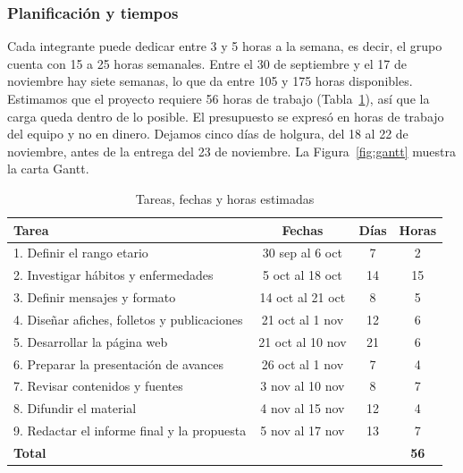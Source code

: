 \documentclass[12pt, letterpaper, table, xcdraw]{extarticle}
\newcommand{\leyendaFont}[1]{\fontsize{10}{12}\selectfont #1}
\newcommand{\filaTabla}[1]{#1\\\hline}
\newcommand{\tabla}[4]{%
    \begin{table}[!htbp]
        \centering
        \caption{\leyendaFont{#1}}
        \label{tab:#2}
        {\scriptsize
            \begin{tabular}{#3}
                \hline #4
            \end{tabular}
        }
    \end{table}
}
\begin{document}
\subsubsection{Planificación y tiempos}

Cada integrante puede dedicar entre 3 y 5 horas a la semana, es decir, el grupo cuenta con 15 a 25 horas semanales. Entre el 30 de septiembre y el 17 de noviembre hay siete semanas, lo que da entre 105 y 175 horas disponibles. Estimamos que el proyecto requiere 56 horas de trabajo (Tabla~\ref{tab:horas}), así que la carga queda dentro de lo posible. El presupuesto se expresó en horas de trabajo del equipo y no en dinero. Dejamos cinco días de holgura, del 18 al 22 de noviembre, antes de la entrega del 23 de noviembre. La Figura~\ref{fig:gantt} muestra la carta Gantt.

\tabla{Tareas, fechas y horas estimadas}{horas}{|l|c|c|c|}{%
    \filaTabla{\textbf{Tarea} & \textbf{Fechas} & \textbf{Días} & \textbf{Horas}}
    \filaTabla{1. Definir el rango etario & 30 sep al 6 oct & 7 & 2}
    \filaTabla{2. Investigar hábitos y enfermedades & 5 oct al 18 oct & 14 & 15}
    \filaTabla{3. Definir mensajes y formato & 14 oct al 21 oct & 8 & 5}
    \filaTabla{4. Diseñar afiches, folletos y publicaciones & 21 oct al 1 nov & 12 & 6}
    \filaTabla{5. Desarrollar la página web & 21 oct al 10 nov & 21 & 6}
    \filaTabla{6. Preparar la presentación de avances & 26 oct al 1 nov & 7 & 4}
    \filaTabla{7. Revisar contenidos y fuentes & 3 nov al 10 nov & 8 & 7}
    \filaTabla{8. Difundir el material & 4 nov al 15 nov & 12 & 4}
    \filaTabla{9. Redactar el informe final y la propuesta & 5 nov al 17 nov & 13 & 7}
    \filaTabla{\textbf{Total} & & & \textbf{56}}
}
\end{document}
